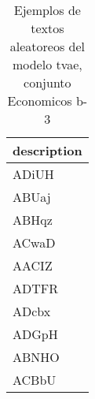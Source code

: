\begin{table}[H]
\centering
\fontsize{8}{14}\selectfont
\caption{Ejemplos de textos aleatoreos del modelo tvae, conjunto Economicos b-3}
\label{table-sample10-economicos-b-3-tvae-text}
\begin{tabular}{|m{50em}|}
\hline
\rowcolor[gray]{0.8}
description \\
\hline ADiUH \\
\hline ABUaj \\
\hline ABHqz \\
\hline ACwaD \\
\hline AACIZ \\
\hline ADTFR \\
\hline ADcbx \\
\hline ADGpH \\
\hline ABNHO \\
\hline ACBbU \\
\hline
\end{tabular}
\end{table}
